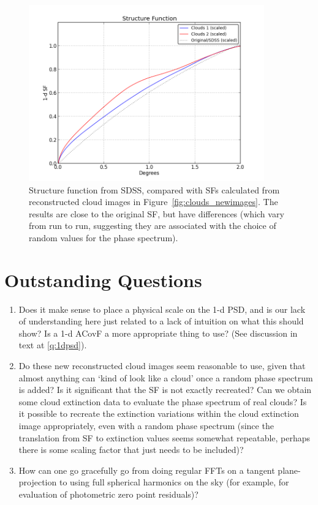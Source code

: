\documentclass[11pt,preprint]{aastex}
\begin{document}
\begin{figure}[htpb]
\centering
\includegraphics[width=4in]{clouds_sf_new}
\caption{{\small
Structure function from SDSS, compared with SFs calculated from reconstructed cloud images in Figure~\ref{fig:clouds_newimages}. The results are close to the original SF, but have differences (which vary from run to run, suggesting they are associated with the choice of random values for the phase spectrum).}}
\label{fig:clouds_sf_new}
\end{figure}


\section{Outstanding Questions}
\begin{enumerate}
\item{Does it make sense to place a physical scale on the 1-d PSD, and is our lack of understanding here just related to a lack of intuition on what this should show? Is a 1-d ACovF a more appropriate thing to use? (See discussion in text at \ref{q:1dpsd}).}
\item{Do these new reconstructed cloud images seem reasonable to use, given that almost anything can `kind of look like a cloud' once a random phase spectrum is added? Is it significant that the SF is not exactly recreated? Can we obtain some cloud extinction data to evaluate the phase spectrum of real clouds? Is it possible to recreate the extinction variations within the cloud extinction image appropriately, even with a random phase spectrum (since the translation from SF to extinction values seems somewhat repeatable, perhaps there is some scaling factor that just needs to be included)?}
\item{How can one go gracefully go from doing regular FFTs on a tangent plane-projection to using full spherical harmonics on the sky (for example, for evaluation of photometric zero point residuals)?}
\end{enumerate}
\end{document}
